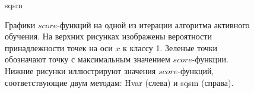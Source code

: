 \documentclass{llncs}
\begin{document}
\begin{figure}[h]
\begin{minipage}[h]{0.49\linewidth}
\end{minipage}
\hfill
\begin{minipage}[h]{0.49\linewidth}
 sqsm
\end{minipage}
\caption{Графики $score$-функций на одной из итерации алгоритма активного обучения. На верхних рисунках изображены вероятности принадлежности точек на оси $x$ к классу 1. Зеленые точки обозначают точку с максимальным значением $score$-функции. Нижние рисунки иллюстрируют значения $score$-функций, соответствующие двум методам: Hvar (слева) и sqsm (справа).}
\label{scoreplots}
\end{figure}

\end{document}
